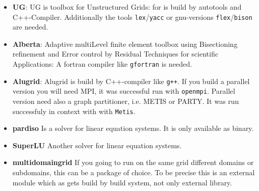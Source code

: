 \begin{itemize}
\item \textbf{UG}: UG is toolbox for Unstructured Grids: for \Dumux is build by autotools and C++-Compiler. Additionally the tools \texttt{lex}/\texttt{yacc} or gnu-versions \texttt{flex}/\texttt{bison} are needed. 

\item \textbf{Alberta}: Adaptive multiLevel finite element toolbox using Bisectioning refinement and Error control by Residual Techniques for scientific Applications: A fortran compiler like \texttt{gfortran} is needed.

\item \textbf{Alugrid}: Alugrid is build by C++-compiler like \texttt{g++}. If you build a parallel version you will need MPI, it was successful run with \texttt{openmpi}. Parallel version need also a graph partitioner, i.e. METIS or PARTY. It was run successfuly in context with \Dune with \texttt{Metis}.


\item \textbf{pardiso} Is a solver for linear equation systems. It is only available as binary.

\item \textbf{SuperLU} Another solver for linear equation systems.

\item \textbf{\Dune multidomaingrid} If you going to run on the same grid different domains or subdomains, this can be a package of choice. To be precise this is an external \Dune module which as \Dumux gets build by \Dune build system, not only external library.
\end{itemize}

